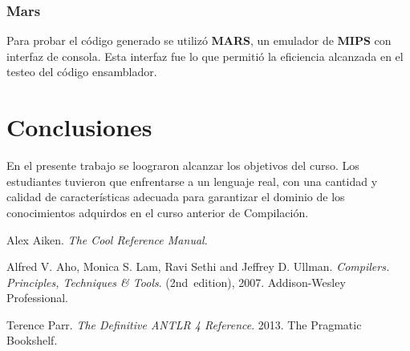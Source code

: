 \documentclass[]{article}
\begin{document}
		\subsubsection{Mars}\label{sec:mars}
			Para probar el código generado se utilizó \textbf{MARS}, un emulador de \textbf{MIPS} con interfaz de consola. Esta interfaz fue lo que permitió la eficiencia alcanzada en el testeo del código ensamblador.

\section{Conclusiones}\label{sec:con}
	En el presente trabajo se loograron alcanzar los objetivos del curso. Los estudiantes tuvieron que enfrentarse a un lenguaje real, con una cantidad y calidad de características adecuada para garantizar el dominio de los conocimientos adquirdos en el curso anterior de Compilación.
	
	

\begin{thebibliography}{1}
	 Alex Aiken. \emph{The Cool Reference Manual}.
		
	 Alfred V. Aho, Monica S. Lam, Ravi Sethi and Jeffrey D. Ullman. \emph{Compilers. Principles, Techniques \& Tools}.
	(2nd~edition),  2007.
	Addison-Wesley Professional.

	 Terence Parr. \emph{The Definitive ANTLR 4 Reference}.
	2013.
	The Pragmatic Bookshelf.
	
\end{thebibliography}
	
\end{document}

